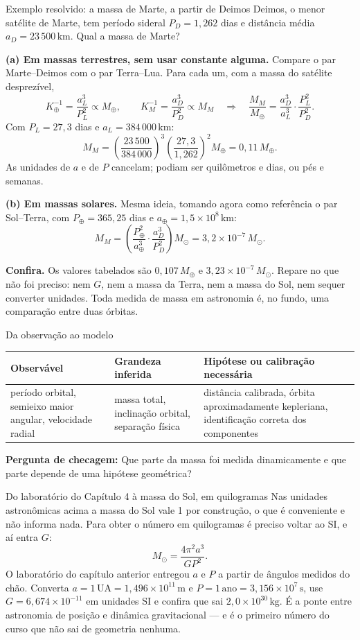 \documentclass[11pt,a4paper]{article}
\newcommand{\observaveis}[4]{%
  \begin{lessonblock}[borderline west={2pt}{0pt}{astroBlue}]{Da observação ao modelo}%
  \begin{tabular}{>{\raggedright\arraybackslash}p{0.27\textwidth}>{\raggedright\arraybackslash}p{0.27\textwidth}>{\raggedright\arraybackslash}p{0.34\textwidth}}
  \toprule
  Observável & Grandeza inferida & Hipótese ou calibração necessária \\
  \midrule
  #1 & #2 & #3 \\
  \bottomrule
  \end{tabular}

  \textbf{Pergunta de checagem:} #4
  \end{lessonblock}
}
\begin{document}
\begin{lessonblock}[borderline west={2pt}{0pt}{astroGold}]{Exemplo resolvido: a massa de Marte, a partir de Deimos}
Deimos, o menor satélite de Marte, tem período sideral $P_D=1{,}262$ dias e distância média
$a_D=23\,500\,\mathrm{km}$. Qual a massa de Marte?

\textbf{(a) Em massas terrestres, sem usar constante alguma.} Compare o par Marte--Deimos com o par
Terra--Lua. Para cada um, com a massa do satélite desprezível,
\[
K_\oplus^{-1}=\frac{a_L^{3}}{P_L^{2}}\propto M_\oplus,
\qquad
K_M^{-1}=\frac{a_D^{3}}{P_D^{2}}\propto M_M
\quad\Longrightarrow\quad
\frac{M_M}{M_\oplus}=\frac{a_D^{3}}{a_L^{3}}\cdot\frac{P_L^{2}}{P_D^{2}}.
\]
Com $P_L=27{,}3$ dias e $a_L=384\,000\,\mathrm{km}$:
\[
M_M=\left(\frac{23\,500}{384\,000}\right)^{3}\left(\frac{27{,}3}{1{,}262}\right)^{2}M_\oplus
=0{,}11\,M_\oplus.
\]
As unidades de $a$ e de $P$ cancelam; podiam ser quilômetros e dias, ou pés e semanas.

\textbf{(b) Em massas solares.} Mesma ideia, tomando agora como referência o par Sol--Terra, com
$P_\oplus=365{,}25$ dias e $a_\oplus=1{,}5\times10^{8}\,\mathrm{km}$:
\[
M_M=\left(\frac{P_\oplus^{2}}{a_\oplus^{3}}\cdot\frac{a_D^{3}}{P_D^{2}}\right)M_\odot
=3{,}2\times10^{-7}\,M_\odot.
\]

\textbf{Confira.} Os valores tabelados são $0{,}107\,M_\oplus$ e $3{,}23\times10^{-7}\,M_\odot$. Repare no que
não foi preciso: nem $G$, nem a massa da Terra, nem a massa do Sol, nem sequer converter unidades. Toda medida
de massa em astronomia é, no fundo, uma comparação entre duas órbitas.
\end{lessonblock}

\observaveis{período orbital, semieixo maior angular, velocidade radial}{massa total, inclinação orbital, separação física}{distância calibrada, órbita aproximadamente kepleriana, identificação correta dos componentes}{Que parte da massa foi medida dinamicamente e que parte depende de uma hipótese geométrica?}

\begin{lessonblock}{Do laboratório do Capítulo 4 à massa do Sol, em quilogramas}
Nas unidades astronômicas acima a massa do Sol vale 1 por construção, o que é conveniente e não informa nada.
Para obter o número em quilogramas é preciso voltar ao SI, e aí entra $G$:
\[
M_\odot=\frac{4\pi^{2}a^{3}}{GP^{2}}.
\]
O laboratório do capítulo anterior entregou $a$ e $P$ a partir de ângulos medidos do chão. Converta
$a=1\,\mathrm{UA}=1{,}496\times10^{11}\,\mathrm{m}$ e $P=1\,\text{ano}=3{,}156\times10^{7}\,\mathrm{s}$, use
$G=6{,}674\times10^{-11}$ em unidades SI e confira que sai $2{,}0\times10^{30}\,\mathrm{kg}$. É a ponte entre
astronomia de posição e dinâmica gravitacional --- e é o primeiro número do curso que não sai de geometria
nenhuma.
\end{lessonblock}
\end{document}
